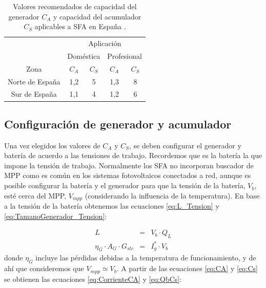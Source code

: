 %
\begin{table}
\caption[Valores recomendados de capacidad del generador y capacidad del acumulador
aplicables a SFA en España.]{Valores recomendados de capacidad del generador $C_{A}$ y capacidad
del acumulador $C_{S}$ aplicables a SFA en España \cite{Lorenzo2006c}.\label{tab:ValoresCACSEspana}}


\centering{}\begin{tabular}{ccccc}
\toprule 
 & \multicolumn{4}{c}{Aplicación}\tabularnewline
\cmidrule{2-5} 
 & \multicolumn{2}{c}{Doméstica} & \multicolumn{2}{c}{Profesional}\tabularnewline
\midrule
\midrule 
Zona & $C_{A}$ & $C_{S}$ & $C_{A}$ & $C_{S}$\tabularnewline
\midrule 
Norte de España & 1,2 & 5 & 1,3 & 8\tabularnewline
\midrule 
Sur de España & 1,1 & 4 & 1,2 & 6\tabularnewline
\bottomrule
\end{tabular}
\end{table}



\subsection{Configuración de generador y acumulador}

Una vez elegidos los valores de $C_{A}$ y $C_{S}$, se deben configurar
el generador y batería de acuerdo a las tensiones de trabajo. Recordemos
que es la batería la que impone la tensión de trabajo. Normalmente
los SFA no incorporan buscador de MPP como es común en los sistemas
fotovoltaicos conectados a red, aunque es posible configurar la batería
y el generador para que la tensión de la batería, $V_{b}$, esté cerca
del MPP, $V_{mpp}$ (considerando la influencia de la temperatura).
En base a la tensión de la batería obtenemos las ecuaciones \ref{eq:L_Tension}
y \ref{eq:TamanoGenerador_Tension}:

\begin{eqnarray}
L & = & V_{b}\cdot Q_{L}\label{eq:L_Tension}\\
\eta_{G}\cdot A_{G}\cdot G_{stc} & = & I_{g}^{*}\cdot V_{b}\label{eq:TamanoGenerador_Tension}\end{eqnarray}
donde $\eta_{G}$ incluye las pérdidas debidas a la temperatura de
funcionamiento, y de ahí que consideremos que $V_{mpp}\simeq V_{b}$.
A partir de las ecuaciones \ref{eq:CA} y \ref{eq:Cs} se obtienen
las ecuaciones \ref{eq:CorrienteCA} y \ref{eq:QbCs}: 

